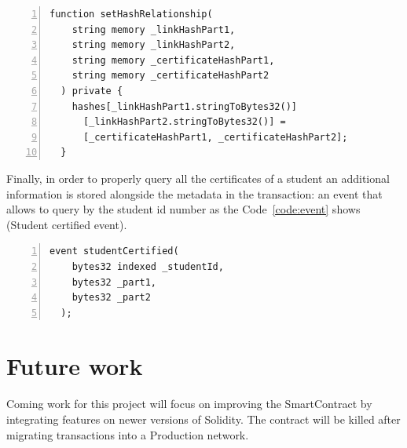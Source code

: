 \documentclass[runningheads]{llncs}
\begin{document}
\begin{Verbatim}[frame=single,numbers=left,label=Mappings binding]
function setHashRelationship(
    string memory _linkHashPart1,
    string memory _linkHashPart2,
    string memory _certificateHashPart1,
    string memory _certificateHashPart2
  ) private {
    hashes[_linkHashPart1.stringToBytes32()]
      [_linkHashPart2.stringToBytes32()] = 
      [_certificateHashPart1, _certificateHashPart2];
  }
\end{Verbatim}
\label{code:binding}

Finally, in order to properly query all the certificates of a student an additional information is stored alongside the metadata in the transaction: an event that allows to query by the student id number as the Code~\ref{code:event} shows (Student certified event).

\begin{Verbatim}[frame=single,numbers=left,label=Student certified event]
event studentCertified(
    bytes32 indexed _studentId,
    bytes32 _part1,
    bytes32 _part2
  );
\end{Verbatim}
\label{code:event}

\section{Future work}
Coming work for this project will focus on improving the SmartContract by integrating features on newer versions of Solidity. The contract will be killed after migrating transactions into a Production network. 

%
%
%


%
\end{document}
